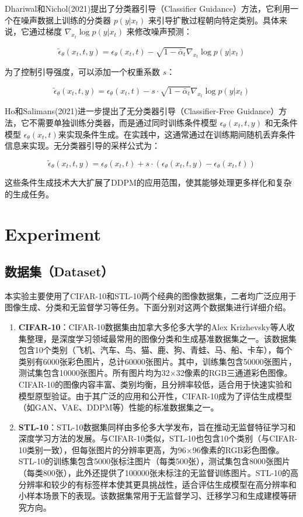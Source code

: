 \documentclass{ctexart}
\begin{document}
Dhariwal和Nichol(2021)提出了分类器引导（Classifier Guidance）方法，它利用一个在噪声数据上训练的分类器 $p(y|x_t)$ 来引导扩散过程朝向特定类别。具体来说，它通过梯度 $\nabla_{x_t} \log p(y|x_t)$ 来修改噪声预测：

$$ \tilde{\epsilon}_\theta(x_t, t, y) = \epsilon_\theta(x_t, t) - \sqrt{1 - \bar{\alpha}_t} \nabla_{x_t} \log p(y|x_t) $$

为了控制引导强度，可以添加一个权重系数 $s$：

$$ \tilde{\epsilon}_\theta(x_t, t, y) = \epsilon_\theta(x_t, t) - s \cdot \sqrt{1 - \bar{\alpha}_t} \nabla_{x_t} \log p(y|x_t) $$


Ho和Salimans(2021)进一步提出了无分类器引导（Classifier-Free Guidance）方法，它不需要单独训练分类器，而是通过同时训练条件模型 $\epsilon_\theta(x_t, t, y)$ 和无条件模型 $\epsilon_\theta(x_t, t)$来实现条件生成。在实践中，这通常通过在训练期间随机丢弃条件信息来实现。无分类器引导的采样公式为：

$$ \tilde{\epsilon}_\theta(x_t, t, y) = \epsilon_\theta(x_t, t) + s \cdot (\epsilon_\theta(x_t, t, y) - \epsilon_\theta(x_t, t)) $$


这些条件生成技术大大扩展了DDPM的应用范围，使其能够处理更多样化和复杂的生成任务。

\section{Experiment}

\subsection{数据集（Dataset）}
\noindent
本实验主要使用了CIFAR-10和STL-10两个经典的图像数据集，二者均广泛应用于图像生成、分类和无监督学习等任务。下面分别对这两个数据集进行详细介绍。

\begin{enumerate}
    \item \textbf{CIFAR-10}：CIFAR-10数据集由加拿大多伦多大学的Alex Krizhevsky等人收集整理，是深度学习领域最常用的图像分类和生成基准数据集之一。该数据集包含10个类别（飞机、汽车、鸟、猫、鹿、狗、青蛙、马、船、卡车），每个类别有6000张彩色图片，总计60000张图片。其中，训练集包含50000张图片，测试集包含10000张图片。所有图片均为32$\times$32像素的RGB三通道彩色图像。CIFAR-10的图像内容丰富、类别均衡，且分辨率较低，适合用于快速实验和模型原型验证。由于其广泛的应用和公开性，CIFAR-10成为了评估生成模型（如GAN、VAE、DDPM等）性能的标准数据集之一。
    \item \textbf{STL-10}：STL-10数据集同样由多伦多大学发布，旨在推动无监督特征学习和深度学习方法的发展。与CIFAR-10类似，STL-10也包含10个类别（与CIFAR-10类别一致），但每张图片的分辨率更高，为96$\times$96像素的RGB彩色图像。STL-10的训练集包含5000张标注图片（每类500张），测试集包含8000张图片（每类800张），此外还提供了100000张未标注的无监督训练图片。STL-10的高分辨率和较少的有标签样本使其更具挑战性，适合评估生成模型在高分辨率和小样本场景下的表现。该数据集常用于无监督学习、迁移学习和生成建模等研究方向。
\end{enumerate}
\end{document}
